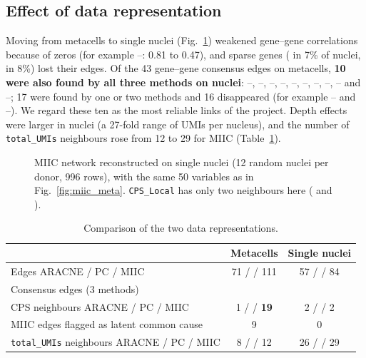 \subsection{Effect of data representation}
Moving from metacells to single nuclei (Fig.~\ref{fig:miic_nuc}) weakened gene--gene correlations because of zeros (for example --: 0.81 to 0.47), and sparse genes ( in 7\% of nuclei,  in 8\%) lost their edges. Of the 43 gene--gene consensus edges on metacells, \textbf{10 were also found by all three methods on nuclei}: --, --, --, --, --, --, --, --, -- and --; 17 were found by one or two methods and 16 disappeared (for example -- and --). We regard these ten as the most reliable links of the project. Depth effects were larger in nuclei (a 27-fold range of UMIs per nucleus), and the number of \texttt{total\_UMIs} neighbours rose from 12 to 29 for MIIC (Table~\ref{tab:comp}).

\begin{figure}[ht]
\centering
\caption{MIIC network reconstructed on single nuclei (12 random nuclei per donor, 996 rows), with the same 50 variables as in Fig.~\ref{fig:miic_meta}. \texttt{CPS\_Local} has only two neighbours here ( and ).}\label{fig:miic_nuc}
\end{figure}

\begin{table}[ht]
\centering\small
\caption{Comparison of the two data representations.\pcnote{}}\label{tab:comp}
\begin{tabular}{lcc}
\toprule
 & Metacells & Single nuclei\\
\midrule
Edges ARACNE / PC / MIIC & 71 / \pcEdgesMeta{}\pcstar{} / 111 & 57 / \pcEdgesNuc{}\pcstar{} / 84\\
Consensus edges (3 methods) & \consMeta{} & \consNuc{}\\
CPS neighbours ARACNE / PC / MIIC & 1 / \pcCpsMeta{}\pcstar{} / \textbf{19} & 2 / \pcCpsNuc{}\pcstar{} / 2\\
MIIC edges flagged as latent common cause & 9 & 0\\
\texttt{total\_UMIs} neighbours ARACNE / PC / MIIC & 8 / \pcUmiMeta{}\pcstar{} / 12 & 26 / \pcUmiNuc{}\pcstar{} / 29\\
\bottomrule
\end{tabular}
\end{table}


